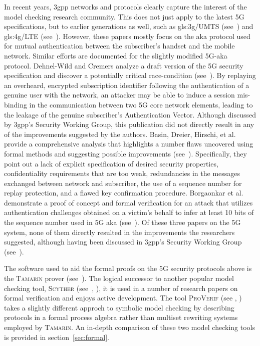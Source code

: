 In recent years, \gls{3gpp} networks and protocols clearly capture the interest of the model checking research community.
This does not just apply to the latest 5G specifications, but to earlier generations as well, such as \gls{gls:3g}/UMTS (see~\cite{alt2016cryptographic}) and \gls{gls:4g}/LTE (see~\cite{lee2014anonymity}).
However, these papers mostly focus on the \gls{aka} protocol used for mutual authentication between the subscriber's handset and the mobile network.
Similar efforts are documented for the slightly modified 5G-\gls{aka} protocol.
Dehnel-Wild and Cremers analyze a draft version of the 5G security specification and discover a potentially critical race-condition (see~\cite{dehnel2018security}).
By replaying an overheard, encrypted subscription identifier following the authentication of a genuine user with the network, an attacker may be able to induce a session mis-binding in the communication between two 5G core network elements, leading to the leakage of the genuine subscriber's Authentication Vector.
Although discussed by \gls{3gpp}'s Security Working Group, this publication did not directly result in any of the improvements suggested by the authors.
Basin, Dreier, Hirschi, et al. provide a comprehensive analysis that highlights a number flaws uncovered using formal methods and suggesting possible improvements (see~\cite{basin2018formal}).
Specifically, they point out a lack of explicit specification of desired security properties, confidentiality requirements that are too weak, redundancies in the messages exchanged between network and subscriber, the use of a sequence number for replay protection, and a flawed key confirmation procedure.
Borgaonkar et al. demonstrate a proof of concept and formal verification for an attack that utilizes authentication challenges obtained on a victim's behalf to infer at least 10 bits of the sequence number used in 5G \gls{aka} (see~\cite{borgaonkar2019new}).
Of these three papers on the 5G system, none of them directly resulted in the improvements the researchers suggested, although having been discussed in \gls{3gpp}'s Security Working Group (see~\cite{s3-180727}).\medskip

The software used to aid the formal proofs on the 5G security protocols above is the \textsc{Tamarin} prover (see~\cite{meier2013tamarin}).
The logical successor to another popular model checking tool, \textsc{Scyther} (see~\cite{cremers2008scyther}, \cite{scyther}), it is used in a number of research papers on formal verification and enjoys active development.
The tool \textsc{ProVerif} (see \cite{blanchet2016modeling}, \cite{proverif}) takes a slightly different approch to symbolic model checking by describing protocols in a formal process algebra rather than multiset rewriting systems employed by \textsc{Tamarin}.
An in-depth comparison of these two model checking tools is provided in section~\ref{sec:formal}.

